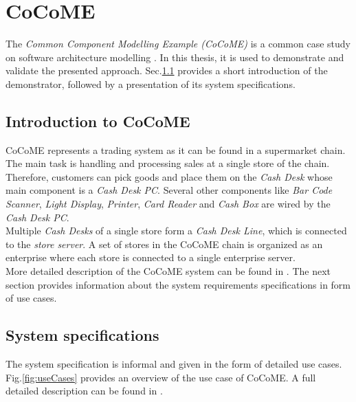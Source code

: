\chapter{CoCoME}
\label{ch:CoCoME}
The \textit{Common Component Modelling Example (CoCoME)} is a common case study on software architecture modelling \cite{CoCoMEOld}\cite{CoCoMETechnical}. In this thesis, it is used to demonstrate and validate the presented approach. Sec.\ref{sec:CoCoME:Introduction} provides a short introduction of the demonstrator, followed by a presentation of its system specifications.


\section{Introduction to CoCoME}
\label{sec:CoCoME:Introduction}
CoCoME represents a trading system as it can be found in a supermarket chain. The main task is handling and processing sales at a single store of the chain. Therefore, customers can pick goods and place them on the \textit{Cash Desk} whose main component is a \textit{Cash Desk PC}. Several other components like \textit{Bar Code Scanner}, \textit{Light Display}, \textit{Printer}, \textit{Card Reader} and \textit{Cash Box} are wired by the  \textit{Cash Desk PC}. \\
Multiple  \textit{Cash Desks} of a single store form a  \textit{Cash Desk Line}, which is connected to the  \textit{store server}. A set of stores in the CoCoME chain is organized as an enterprise where each store is connected to a single enterprise server. \\
More detailed description of the CoCoME system can be found in \cite{CoCoMEOld}\cite{CoCoMETechnical}. The next section provides information about the system requirements specifications in form of use cases.
 


\section{System specifications}
\label{sec:CoCoME:systemSpecifications}
The system specification is informal and given in the form of detailed use cases. Fig.\ref{fig:useCases} provides an overview of the use case of CoCoME. A full detailed description can be found in \cite{CoCoMEOld}.




